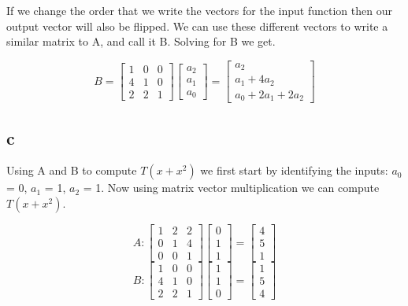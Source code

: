 \documentclass[12pt]{article}
\begin{document}
If we change the order that we write the vectors for the input function then our output vector will also be flipped. We can use these different vectors to write a similar matrix to A, and call it B. Solving for B we get.

\[
B = 
\begin{bmatrix}
1 & 0 & 0\\
4 & 1 & 0\\
2 & 2 & 1
\end{bmatrix}
\begin{bmatrix}
a_{2}\\
a_{1}\\
a_{0}
\end{bmatrix}
=
\begin{bmatrix}
a_{2}\\
a_{1} + 4a_{2}\\
a_{0} + 2a_{1} + 2a_{2}
\end{bmatrix}
\]

\subsection*{c}
Using A and B to compute $T(x + x^{2})$ we first start by identifying the inputs: $a_{0}$ = 0, $a_{1}$ = 1, $a_{2}$ = 1. Now using matrix vector multiplication we can compute $T(x + x^{2})$.

\[
A:
\begin{bmatrix}
1 & 2 & 2\\
0 & 1 & 4\\
0 & 0 & 1
\end{bmatrix}
\begin{bmatrix}
0\\
1\\
1
\end{bmatrix}
=
\begin{bmatrix}
4\\
5\\
1
\end{bmatrix}
\]
\[
B:
\begin{bmatrix}
1 & 0 & 0\\
4 & 1 & 0\\
2 & 2 & 1
\end{bmatrix}
\begin{bmatrix}
1\\
1\\
0
\end{bmatrix}
=
\begin{bmatrix}
1\\
5\\
4
\end{bmatrix}
\]
\end{document}
